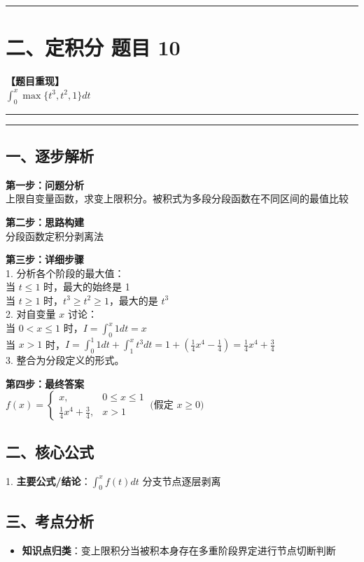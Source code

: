 ﻿\documentclass[12pt, a4paper]{ctexart}
\newcommand{\TopSeparator}{
    \par\noindent\rule{\textwidth}{1.5pt}\vspace{0.5em}
}
\newcommand{\AnalysisSeparator}{
    \par\noindent\rule{\textwidth}{0.5pt}\vspace{0.2em}\hrule\vspace{0.5em}
}
\newenvironment{RedAnalysis}{
    \par
    \color{red} 
}{
    \par
    \color{black} 
}
\begin{document}
\vspace{2em}

\TopSeparator
\section*{二、定积分 题目 10}

\textbf{【题目重现】} \\
$\int_{0}^{x} \max\{t^3, t^2, 1\} dt$

\AnalysisSeparator

\begin{RedAnalysis}

	\subsection*{一、逐步解析}

	\textbf{第一步：问题分析} \\
	上限自变量函数，求变上限积分。被积式为多段分段函数在不同区间的最值比较

	\textbf{第二步：思路构建} \\
	分段函数定积分剥离法

	\textbf{第三步：详细步骤} \\
	1. 分析各个阶段的最大值：\\ 
	当 $t \le 1$ 时，最大的始终是 1 \\ 
	当 $t \ge 1$ 时，$t^3 \ge t^2 \ge 1$，最大的是 $t^3$ \\ 
	2. 对自变量 $x$ 讨论：\\ 
	当 $0 < x \le 1$ 时，$I = \int_0^x 1 dt = x$ \\ 
	当 $x > 1$ 时，$I = \int_0^1 1 dt + \int_1^x t^3 dt = 1 + \left( \frac{1}{4}x^4 - \frac{1}{4} \right) = \frac{1}{4}x^4 + \frac{3}{4}$ \\ 
	3. 整合为分段定义的形式。

	\textbf{第四步：最终答案} \\
	$f(x) = \begin{cases} x, & 0 \le x \le 1 \\ \frac{1}{4}x^4 + \frac{3}{4}, & x > 1 \end{cases} \ \text{(假定 } x \ge 0\text{)}$

	\subsection*{二、核心公式}
	1. \textbf{主要公式/结论}：$\int_0^x f(t) dt \text{ 分支节点逐层剥离}$

	\subsection*{三、考点分析}
	\begin{itemize}
		\item \textbf{知识点归类}：变上限积分当被积本身存在多重阶段界定进行节点切断判断
	\end{itemize}

\end{RedAnalysis}

\vspace{2em}
\end{document}
